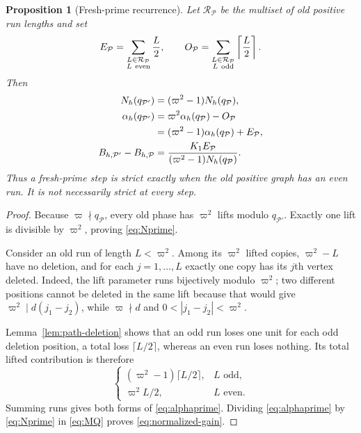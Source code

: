 \documentclass[11pt]{article}
\newtheorem{proposition}[theorem]{Proposition}
\theoremstyle{definition}
\theoremstyle{remark}
\begin{document}
\begin{proposition}[Fresh-prime recurrence]
\label{prop:fresh-recurrence}
Let \(\mathcal R_{\mathcal P}\) be the multiset of old positive run
lengths and set
\[
 E_{\mathcal P}=
 \sum_{\substack{L\in\mathcal R_{\mathcal P}\\L\ {\rm even}}}\frac L2,
 \qquad
 O_{\mathcal P}=
 \sum_{\substack{L\in\mathcal R_{\mathcal P}\\L\ {\rm odd}}}
 \left\lceil\frac L2\right\rceil.
\]
Then
\begin{align}
 N_h(q_{\mathcal P'})
 &=(\varpi^2-1)N_h(q_{\mathcal P}),\label{eq:Nprime}\\
 \alpha_h(q_{\mathcal P'})
 &=\varpi^2\alpha_h(q_{\mathcal P})-O_{\mathcal P}\notag\\
 &=(\varpi^2-1)\alpha_h(q_{\mathcal P})+E_{\mathcal P},
 \label{eq:alphaprime}\\
 B_{h,\mathcal P'}-B_{h,\mathcal P}
 &=\frac{K_1E_{\mathcal P}}
 {(\varpi^2-1)N_h(q_{\mathcal P})}.
 \label{eq:normalized-gain}
\end{align}
Thus a fresh-prime step is strict exactly when the old positive graph has
an even run.  It is not necessarily strict at every step.
\end{proposition}

\begin{proof}
Because \(\varpi\nmid q_{\mathcal P}\), every old phase has
\(\varpi^2\) lifts modulo \(q_{\mathcal P'}\).  Exactly one lift is
divisible by \(\varpi^2\), proving \eqref{eq:Nprime}.

Consider an old run of length \(L<\varpi^2\).  Among its
\(\varpi^2\) lifted copies, \(\varpi^2-L\) have no deletion, and for
each \(j=1,\ldots,L\) exactly one copy has its \(j\)th vertex deleted.
Indeed, the lift parameter runs bijectively modulo \(\varpi^2\); two
different positions cannot be deleted in the same lift because that
would give
\(\varpi^2\mid d(j_1-j_2)\), while
\(\varpi\nmid d\) and \(0<|j_1-j_2|<\varpi^2\).

Lemma~\ref{lem:path-deletion} shows that an odd run loses one unit for
each odd deletion position, a total loss \(\lceil L/2\rceil\), whereas
an even run loses nothing.  Its total lifted contribution is therefore
\[
 \begin{cases}
  (\varpi^2-1)\lceil L/2\rceil,&L\text{ odd},\\
  \varpi^2L/2,&L\text{ even}.
 \end{cases}
\]
Summing runs gives both forms of \eqref{eq:alphaprime}.  Dividing
\eqref{eq:alphaprime} by \eqref{eq:Nprime} in
\eqref{eq:MQ} proves \eqref{eq:normalized-gain}.
\end{proof}
\end{document}
